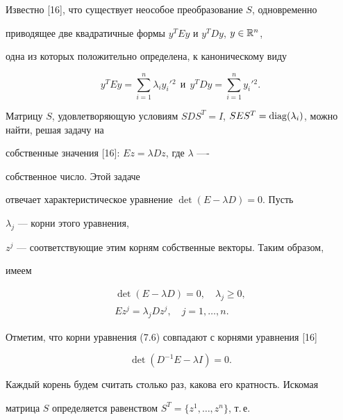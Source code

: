 Известно [16], что существует неособое преобразование $S$, одновременно 


приводящее две квадратичные формы $y^T E y$ и $y^T D y$, $y\in \Bbb R^n$, 


одна из которых положительно определена, к каноническому виду 


$$ 


y^T E y=\sum^n_{i=1}\lambda_i y_i'{}^2\ \ \text{и} \ \ 


y^T D y=\sum^n_{i=1}y_i'{}^2. 


$$ 


 


Матрицу $S$, удовлетворяющую условиям $S D S^T=I$, $S E 


S^T=\diag(\lambda_i)$, можно найти, решая задачу на 


собственные значения [16]: $E z=\lambda D z$, где $\lambda$ ---- 


собственное число. Этой задаче 


отвечает характеристическое уравнение $\det(E-\lambda D)=0$. Пусть 


$\lambda_j$ --- корни этого уравнения, 


$z^j$ --- соответствующие этим корням собственные векторы. Таким образом, 


имеем 


\begin{equation} 


\begin{array}{c} 


\det(E-\lambda D)=0,\quad \lambda_j\ge0,\\[2mm] 


E z^j=\lambda_j D z^j,\quad j=1,\dotsc,n. 


\end{array} 


\end{equation} 


Отметим, что корни уравнения (7.6) совпадают с корнями уравнения [16] 


\begin{equation} 


\det(D^{-1}E-\lambda I)=0. 


\end{equation} 


Каждый корень будем считать столько раз, какова его кратность. Искомая 


матрица $S$ определяется равенством $S^T=\{z^1,\dotsc,z^n\}$, т.\,е. 


